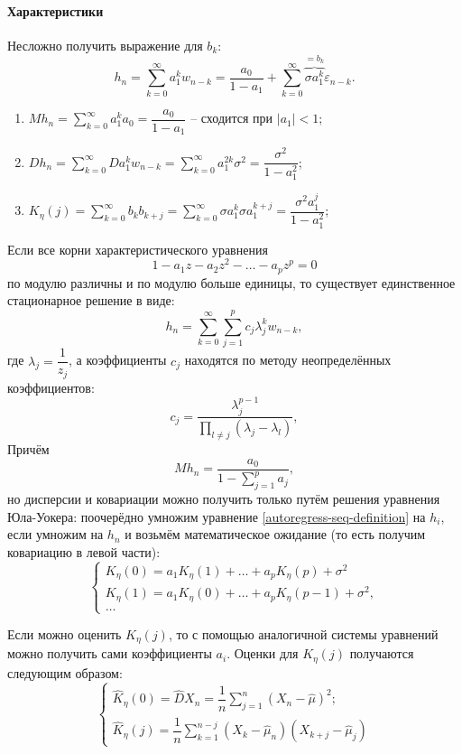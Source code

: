 \paragraph{Характеристики}

Несложно получить выражение для $b_k$:
\[
  h_n = \sum_{k=0}^\infty a_1^k w_{n-k} =
  \dfrac{a_0}{1 - a_1} + \sum_{k=0}^\infty \overbrace{\sigma a_1^k}^{= b_k} \varepsilon_{n-k}.
\]

\begin{enumerate}
  \item $Mh_n = \sum_{k=0}^\infty a_1^k a_0 = \dfrac{a_0}{1 - a_1}$ -- сходится при $|a_1| < 1$;
  \item $Dh_n = \sum_{k=0}^\infty D a_1^k w_{n-k} = \sum_{k=0}^\infty a_1^{2k} \sigma^2 = \dfrac{\sigma^2}{1 - a_1^2}$;
  \item $K_\eta(j) = \sum_{k=0}^\infty b_k b_{k+j} = \sum_{k=0}^\infty \sigma a_1^k \sigma a_1^{k+j} = \dfrac{\sigma^2 a_1^j}{1 - a_1^2}$;
\end{enumerate}

\begin{theorem}
  Если все корни характеристического уравнения
  \[
    1 - a_1 z - a_2 z^2 - \dots - a_p z^p = 0
  \]
  по модулю различны и по модулю больше единицы, то существует единственное стационарное решение
  в виде:
  \[
    h_n = \sum_{k=0}^\infty \sum_{j=1}^p c_j \lambda_j^k w_{n-k},
  \]
  где $\lambda_j = \dfrac{1}{z_j}$, а коэффициенты $c_j$ находятся по методу неопределённых коэффициентов:
  \[
    c_j = \dfrac{\lambda_j^{p-1}}{\prod_{l \neq j} (\lambda_j - \lambda_l)},
  \]
  Причём 
  \[
    Mh_n = \dfrac{a_0}{1 - \sum_{j=1}^p a_j},
  \]
  но дисперсии и ковариации можно получить только путём решения уравнения Юла-Уокера:
  поочерёдно умножим уравнение \eqref{autoregress-seq-definition} на $h_i$, если умножим
  на $h_n$ и возьмём математическое ожидание (то есть получим ковариацию в левой части):
  \[
    \begin{cases}
      K_\eta(0) = a_1 K_\eta(1) + \dots + a_p K_\eta(p) + \sigma^2 \\
      K_\eta(1) = a_1 K_\eta(0) + \dots + a_p K_\eta(p-1) + \sigma^2, \\
      \dots
    \end{cases}
  \]
\end{theorem}

Если можно оценить $K_\eta(j)$, то с помощью аналогичной системы уравнений можно получить
сами коэффициенты $a_i$. Оценки для $K_\eta(j)$ получаются следующим образом:
\[
  \begin{cases}
    \hat{K}_\eta(0) = \hat{D} X_n = \dfrac{1}{n} \sum_{j=1}^n (X_n - \hat{\mu})^2; \\
    \hat{K}_\eta(j) = \dfrac{1}{n} \sum_{k=1}^{n-j} (X_k - \hat{\mu}_n) (X_{k+j} - \hat{\mu}_j)
  \end{cases}
\]
